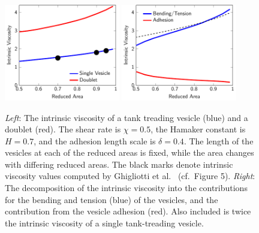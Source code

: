 \documentclass[prf,superscriptaddress,showpacs]{revtex4-1}
\begin{document}
\begin{figure}[htp]
  \centering
  \includegraphics[width=0.45\textwidth]{figs/shear2Ves_adR4em1adS7em1Chi5em1.pdf}
  \includegraphics[width=0.45\textwidth]{figs/doublet_decomp.pdf}
  \caption{\label{fig:shearIntrinsicViscosity} {\em Left}: The intrinsic
  viscosity of a tank treading vesicle (blue) and a doublet (red).  The
  shear rate is $\chi = 0.5$, the Hamaker constant is $H = 0.7$,
  and the adhesion length scale is $\delta = 0.4$.  The length of the
  vesicles at each of the reduced areas is fixed, while the area changes
  with differing reduced areas.  The black marks denote intrinsic
  viscosity values computed by Ghigliotti et
  al.~\cite{GhigliottiBibenMisbah2010_JFM} (cf.~Figure 5).  {\em Right}:
  The decomposition of the intrinsic viscosity into the contributions
  for the bending and tension (blue) of the vesicles, and the
  contribution from the vesicle adhesion (red).  Also included is twice
  the intrinsic viscosity of a single tank-treading vesicle.}
\end{figure}



\end{document}
